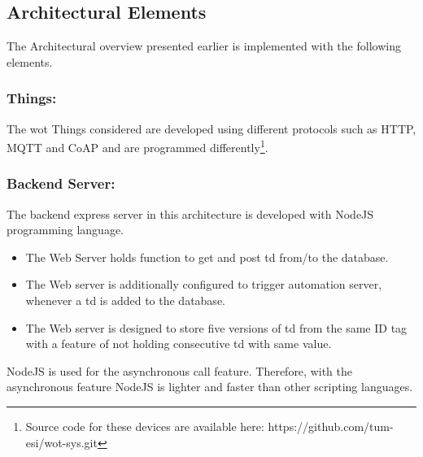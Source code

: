 \documentclass[conference]{IEEEtran}
\theoremstyle{definition}
\begin{document}
\subsection{Architectural Elements}

The Architectural overview presented earlier is implemented with the following elements.

\subsubsection{Things:}

The \ac{wot} Things considered are developed using different protocols such as HTTP, MQTT and CoAP and are programmed differently\footnote{Source code for these devices are available here: https://github.com/tum-esi/wot-sys.git}. 

\subsubsection{Backend Server:}
  
The backend express server in this architecture is developed with NodeJS programming language. 
\begin{itemize}
  \item The Web Server holds function to get and post \ac{td} from/to the database.
  \item The Web server is additionally configured to trigger automation server, whenever a \ac{td} is added to the database.
  \item The Web server is designed to store five versions of \ac{td} from the same ID tag with a feature of not holding consecutive \ac{td} with same value.
\end{itemize} 

NodeJS is used for the asynchronous call feature. 
Therefore, with the asynchronous feature NodeJS is lighter and faster than other scripting languages.
\end{document}
